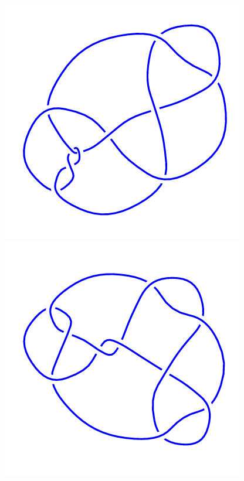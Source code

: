 \begin{figure}[H]
	\begin{minipage}[b]{.18\linewidth}
		\centering
		\includegraphics[width=\linewidth]{../data/10_42.png}
	\end{minipage}
	\begin{minipage}[b]{.18\linewidth}
		\centering
		\includegraphics[width=\linewidth]{../data/10_43.png}

\end{minipage}
\end{figure}
